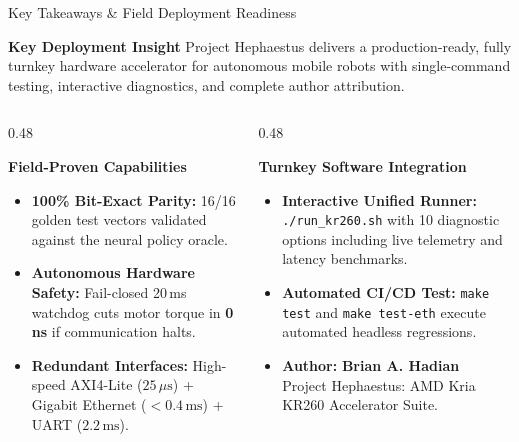 \documentclass[aspectratio=169,10pt]{beamer}
\begin{document}
\begin{frame}{Key Takeaways \& Field Deployment Readiness}
    \begin{block}{\textbf{Key Deployment Insight}}
        Project Hephaestus delivers a production-ready, fully turnkey hardware accelerator for autonomous mobile robots with single-command testing, interactive diagnostics, and complete author attribution.
    \end{block}

    \vspace{0.4em}
    \begin{columns}[T]
        \begin{column}{0.48\textwidth}
            \begin{block}{\textbf{Field-Proven Capabilities}}
                \begin{itemize}\small
                    \item \textbf{100\% Bit-Exact Parity:} 16/16 golden test vectors validated against the neural policy oracle.
                    \item \textbf{Autonomous Hardware Safety:} Fail-closed 20\,ms watchdog cuts motor torque in \textbf{0\,ns} if communication halts.
                    \item \textbf{Redundant Interfaces:} High-speed AXI4-Lite ($25\,\mu\text{s}$) + Gigabit Ethernet ($<0.4\,\text{ms}$) + UART ($2.2\,\text{ms}$).
                \end{itemize}
            \end{block}
        \end{column}

        \begin{column}{0.48\textwidth}
            \begin{block}{\textbf{Turnkey Software Integration}}
                \begin{itemize}\small
                    \item \textbf{Interactive Unified Runner:} \texttt{./run\_kr260.sh} with 10 diagnostic options including live telemetry and latency benchmarks.
                    \item \textbf{Automated CI/CD Test:} \texttt{make test} and \texttt{make test-eth} execute automated headless regressions.
                    \item \textbf{Author:} \textbf{Brian A. Hadian} \\ Project Hephaestus: AMD Kria KR260 Accelerator Suite.
                \end{itemize}
            \end{block}
        \end{column}
    \end{columns}
\end{frame}
\end{document}

